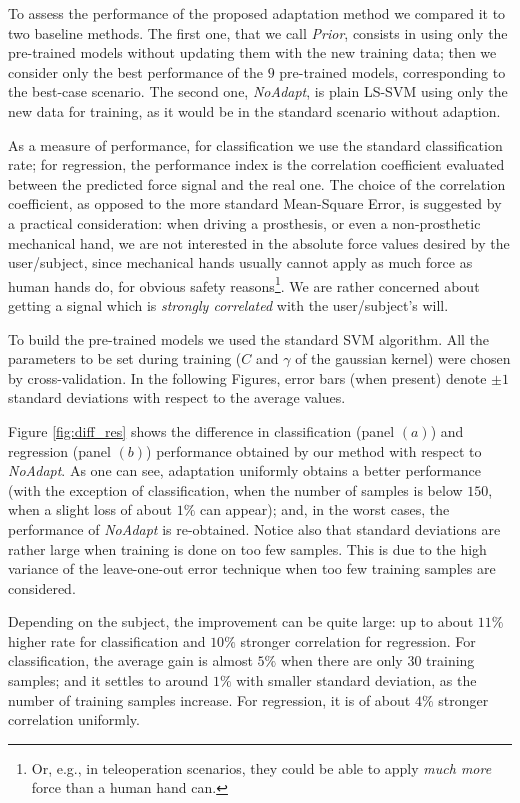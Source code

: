 To assess the performance of the proposed adaptation method we
compared it to two baseline methods. The first one, that we call
\emph{Prior}, consists in using only the pre-trained models without
updating them with the new training data; then we consider only the
best performance of the $9$ pre-trained models, corresponding to the
best-case scenario. The second one, \emph{NoAdapt}, is plain LS-SVM
using only the new data for training, as it would be in the standard
scenario without adaption.

As a measure of performance, for classification we use the standard
classification rate; for regression, the performance index is the
correlation coefficient evaluated between the predicted force signal
and the real one. The choice of the correlation coefficient, as
opposed to the more standard Mean-Square Error, is suggested by a
practical consideration: when driving a prosthesis, or even a
non-prosthetic mechanical hand, we are not interested in the absolute
force values desired by the user/subject, since mechanical hands
usually cannot apply as much force as human hands do, for obvious
safety reasons\footnote{Or, e.g., in teleoperation scenarios, they
could be able to apply \emph{much more} force than a human hand
can.}. We are rather concerned about getting a signal which is
\emph{strongly correlated} with the user/subject's will.

To build the pre-trained models we used the standard SVM
algorithm. All the parameters to be set during training ($C$ and
$\gamma$ of the gaussian kernel) were chosen by cross-validation. In
the following Figures, error bars (when present) denote $\pm 1$
standard deviations with respect to the average values.

Figure \ref{fig:diff_res} shows the difference in classification
(panel $(a)$) and regression (panel $(b)$) performance obtained by our
method with respect to \emph{NoAdapt}. As one can see, adaptation
uniformly obtains a better performance (with the exception of
classification, when the number of samples is below $150$, when a
slight loss of about $1\%$ can appear); and, in the worst cases, the
performance of \emph{NoAdapt} is re-obtained. Notice also that
standard deviations are rather large when training is done on too few
samples. This is due to the high variance of the leave-one-out error
technique when too few training samples are considered.

Depending on the subject, the improvement can be quite large: up to
about $11\%$ higher rate for classification and $10\%$ stronger
correlation for regression. For classification, the average gain is
almost $5\%$ when there are only $30$ training samples; and it settles
to around $1\%$ with smaller standard deviation, as the number of
training samples increase. For regression, it is of about $4\%$
stronger correlation uniformly.

